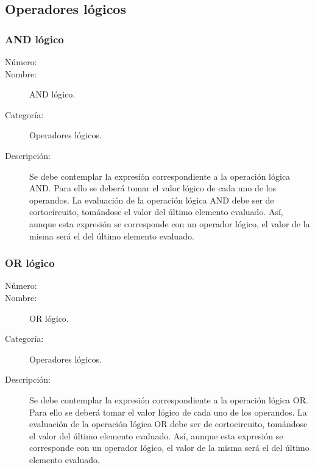 \subsection{Operadores lógicos}
\subsubsection{AND lógico}
	\begin{description}
		\item [Número:] \cn
		\item [Nombre:] AND lógico.
		\item [Categoría:] Operadores lógicos.
		\item [Descripción:] Se debe contemplar la expresión correspondiente a la operación lógica AND. Para ello se deberá tomar
		el valor lógico de cada uno de los operandos. La evaluación de la operación lógica AND debe ser de cortocircuito, tomándose el valor del
		último elemento evaluado. Así, aunque esta expresión se corresponde con un operador lógico, el valor de la misma será el del
		último elemento evaluado.
	\end {description}

\subsubsection{OR lógico}
	\begin{description}
		\item [Número:] \cn
		\item [Nombre:] OR lógico.
		\item [Categoría:] Operadores lógicos.
		\item [Descripción:] Se debe contemplar la expresión correspondiente a la operación lógica OR. Para ello se deberá tomar
		el valor lógico de cada uno de los operandos. La evaluación de la operación lógica OR debe ser de cortocircuito, tomándose el valor del
		último elemento evaluado. Así, aunque esta expresión se corresponde con un operador lógico, el valor de la misma será el del
		último elemento evaluado.
	\end {description}

